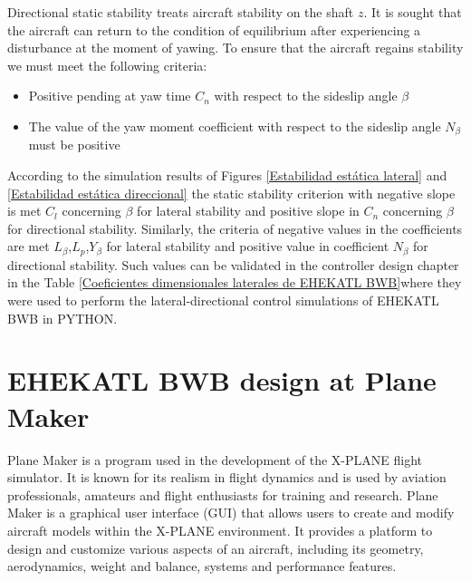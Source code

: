 Directional static stability treats aircraft stability on the shaft $z$. It is sought that the aircraft can return to the condition of equilibrium after experiencing a disturbance at the moment of yawing. To ensure that the aircraft regains stability we must meet the following criteria:
\begin{itemize}
    \item Positive pending at yaw time $C_n$ with respect to the sideslip angle $\beta$
    \item The value of the yaw moment coefficient with respect to the sideslip angle $N_\beta$ must be positive
\end{itemize}

According to the simulation results of Figures \ref{Estabilidad estática lateral} and \ref{Estabilidad estática direccional} the static stability criterion with negative slope is met $C_l$ concerning $\beta$ for lateral stability and positive slope in $C_n$ concerning $\beta$ for directional stability. Similarly, the criteria of negative values in the coefficients are met $L_\beta$,$L_p$,$Y_{\beta}$ for lateral stability and positive value in coefficient $N_\beta$ for directional stability. Such values can be validated in the controller design chapter in the Table \ref{Coeficientes dimensionales laterales de EHEKATL BWB}where they were used to perform the lateral-directional control simulations of EHEKATL BWB in PYTHON. 

\section{EHEKATL BWB design at Plane Maker}


Plane Maker is a program used in the development of the X-PLANE flight simulator. It is known for its realism in flight dynamics and is used by aviation professionals, amateurs and flight enthusiasts for training and research. Plane Maker is a graphical user interface (GUI) that allows users to create and modify aircraft models within the X-PLANE environment. It provides a platform to design and customize various aspects of an aircraft, including its geometry, aerodynamics, weight and balance, systems and performance features.


